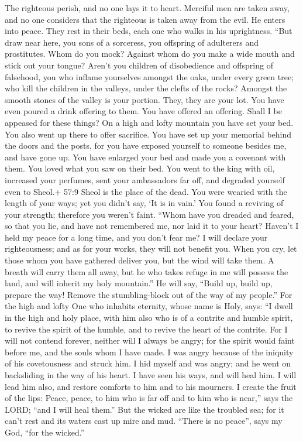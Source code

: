  The righteous perish, and no one lays it to heart. Merciful
men are taken away, and no one considers that the righteous is taken
away from the evil.  He enters into peace. They rest in
their beds, each one who walks in his uprightness.  ``But
draw near here, you sons of a sorceress, you offspring of adulterers and
prostitutes.  Whom do you mock? Against whom do you make a
wide mouth and stick out your tongue? Aren't you children of
disobedience and offspring of falsehood,  you who inflame
yourselves amongst the oaks, under every green tree; who kill the
children in the valleys, under the clefts of the rocks? 
Amongst the smooth stones of the valley is your portion. They, they are
your lot. You have even poured a drink offering to them. You have
offered an offering. Shall I be appeased for these things? 
On a high and lofty mountain you have set your bed. You also went up
there to offer sacrifice.  You have set up your memorial
behind the doors and the posts, for you have exposed yourself to someone
besides me, and have gone up. You have enlarged your bed and made you a
covenant with them. You loved what you saw on their bed. 
You went to the king with oil, increased your perfumes, sent your
ambassadors far off, and degraded yourself even to Sheol.+ 57:9 Sheol is
the place of the dead.  You were wearied with the length of
your ways; yet you didn't say, `It is in vain.' You found a reviving of
your strength; therefore you weren't faint.  ``Whom have
you dreaded and feared, so that you lie, and have not remembered me, nor
laid it to your heart? Haven't I held my peace for a long time, and you
don't fear me?  I will declare your righteousness; and as
for your works, they will not benefit you.  When you cry,
let those whom you have gathered deliver you, but the wind will take
them. A breath will carry them all away, but he who takes refuge in me
will possess the land, and will inherit my holy mountain.''
 He will say, ``Build up, build up, prepare the way! Remove
the stumbling-block out of the way of my people.''  For the
high and lofty One who inhabits eternity, whose name is Holy, says: ``I
dwell in the high and holy place, with him also who is of a contrite and
humble spirit, to revive the spirit of the humble, and to revive the
heart of the contrite.  For I will not contend forever,
neither will I always be angry; for the spirit would faint before me,
and the souls whom I have made.  I was angry because of the
iniquity of his covetousness and struck him. I hid myself and was angry;
and he went on backsliding in the way of his heart.  I have
seen his ways, and will heal him. I will lead him also, and restore
comforts to him and to his mourners.  I create the fruit of
the lips: Peace, peace, to him who is far off and to him who is near,''
says the LORD; ``and I will heal them.''  But the wicked
are like the troubled sea; for it can't rest and its waters cast up mire
and mud.  ``There is no peace'', says my God, ``for the
wicked.''

